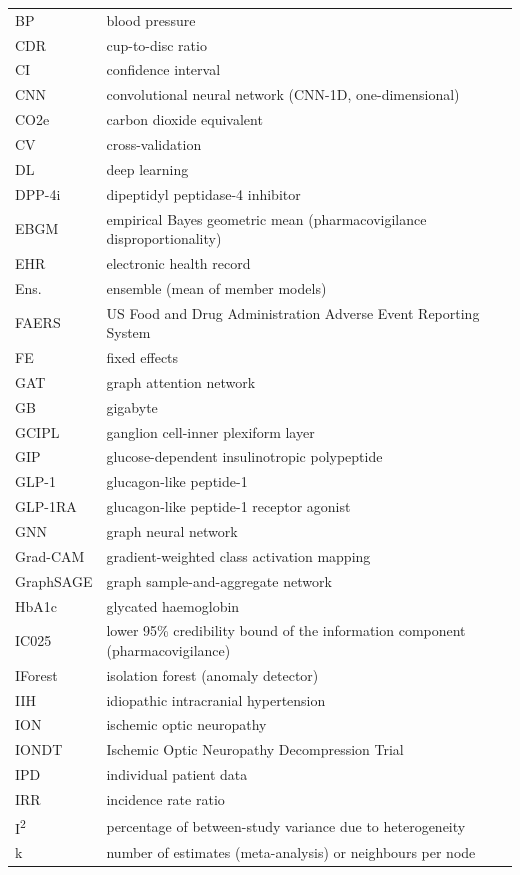 \documentclass[journal]{IEEEtran}
\begin{document}
{\begin{longtable}[]{@{}
  >{\raggedright\arraybackslash}p{}
  >{\raggedright\arraybackslash}p{}@{}}
BP & blood pressure \\
CDR & cup-to-disc ratio \\
CI & confidence interval \\
CNN & convolutional neural network (CNN-1D, one-dimensional) \\
CO2e & carbon dioxide equivalent \\
CV & cross-validation \\
DL & deep learning \\
DPP-4i & dipeptidyl peptidase-4 inhibitor \\
EBGM & empirical Bayes geometric mean (pharmacovigilance
disproportionality) \\
EHR & electronic health record \\
Ens. & ensemble (mean of member models) \\
FAERS & US Food and Drug Administration Adverse Event Reporting
System \\
FE & fixed effects \\
GAT & graph attention network \\
GB & gigabyte \\
GCIPL & ganglion cell-inner plexiform layer \\
GIP & glucose-dependent insulinotropic polypeptide \\
GLP-1 & glucagon-like peptide-1 \\
GLP-1RA & glucagon-like peptide-1 receptor agonist \\
GNN & graph neural network \\
Grad-CAM & gradient-weighted class activation mapping \\
GraphSAGE & graph sample-and-aggregate network \\
HbA1c & glycated haemoglobin \\
IC025 & lower 95\% credibility bound of the information component
(pharmacovigilance) \\
IForest & isolation forest (anomaly detector) \\
IIH & idiopathic intracranial hypertension \\
ION & ischemic optic neuropathy \\
IONDT & Ischemic Optic Neuropathy Decompression Trial \\
IPD & individual patient data \\
IRR & incidence rate ratio \\
I\textsuperscript{2} & percentage of between-study variance due to heterogeneity \\
k & number of estimates (meta-analysis) or neighbours per node

\end{longtable}}
\end{document}
